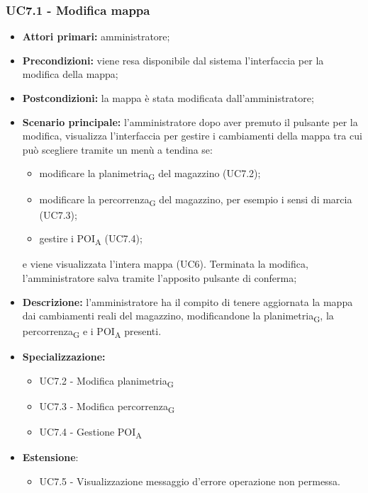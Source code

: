 \subsubsection{UC7.1 - Modifica mappa}
\begin{itemize}
	\item 	\textbf{Attori primari:} amministratore;
	\item 	\textbf{Precondizioni:} viene resa disponibile dal sistema l'interfaccia per la modifica della mappa;
	\item 	\textbf{Postcondizioni:} la mappa è stata modificata dall'amministratore;
	\item 	\textbf{Scenario principale:} l'amministratore dopo aver premuto il pulsante per la modifica, visualizza l'interfaccia per gestire i cambiamenti della mappa tra cui può scegliere tramite un menù a tendina se:
	\begin{itemize}
		\item modificare la planimetria\textsubscript{G} del magazzino (UC7.2);
		\item modificare la percorrenza\textsubscript{G} del magazzino, per esempio i sensi di marcia (UC7.3);
		\item gestire i POI\textsubscript{A} (UC7.4);
	\end{itemize}
	e viene visualizzata l'intera mappa (UC6).
Terminata la modifica, l'amministratore salva tramite l'apposito pulsante di conferma;
	\item 	\textbf{Descrizione:} l'amministratore ha il compito di tenere aggiornata la mappa dai cambiamenti reali del magazzino, modificandone la planimetria\textsubscript{G}, la percorrenza\textsubscript{G} e i POI\textsubscript{A} presenti.
	\item 	\textbf{Specializzazione:} 
	\begin{itemize}
		\item UC7.2 - Modifica planimetria\textsubscript{G}
		\item UC7.3 - Modifica percorrenza\textsubscript{G}
		\item UC7.4 - Gestione POI\textsubscript{A}
	\end{itemize}
	\item \textbf{Estensione}:
	\begin{itemize}
		\item UC7.5 - Visualizzazione messaggio d'errore operazione non permessa.
	\end{itemize}
\end{itemize}


